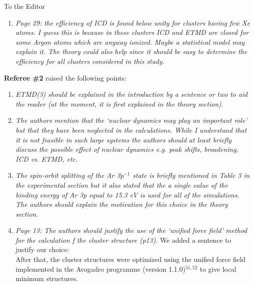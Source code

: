 \documentclass[DIN,pagenumber=false,parskip=half,fromalign=left,fromphone=true,fromemail=true,fromurl=false,fromlogo=false,fromrule=false]{scrlttr2}
\begin{document}
\begin{letter}{To the Editor}
\begin{enumerate}
  \item \emph{Page 29:
        the efficiency of ICD is found below unity for clusters having few Xe atoms. I guess this is because in these clusters ICD and ETMD are closed for some Argon atoms which are anyway ionized. Maybe a statistical model may explain it. The theory could also help since it should be easy to determine the efficiency for all clusters considered in this study.}


\end{enumerate}

\textbf{Referee \#2} raised the following points:

\begin{enumerate}
 \item \emph{ETMD(3) should be explained in the introduction by a sentence or two to aid the reader (at the moment, it is first explained in the theory section).
}
 \item \emph{The authors mention that the ‘nuclear dynamics may play an important role’ but that they have been neglected in the calculations. While I understand that it is not feasible in such large systems the authors should at least briefly discuss the possible effect of nuclear dynamics e.g. peak shifts, broadening, ICD vs. ETMD, etc. }

 \item \emph{The spin-orbit splitting of the Ar 3p$^{-1}$ state is briefly mentioned in Table 3 in the experimental section but it also stated that the a single value of the binding energy of Ar 3p equal to 15.3 eV is used for all of the simulations. The authors should explain the motivation for this choice in the theory section.}

 \item \emph{Page 13:
       The authors should justify the use of the ‘unified force field’ method for the calculation f the cluster structure (p13).}
       We added a sentence to justify our choice:\\
       After that, the cluster structures were optimized using the unified
       force field implemented in the Avogadro programme
       (version 1.1.0)$^{51,52}$ to give local minimum structures.
       {\color{blue}{ The method
       was chosen due to its low computational cost, the possibility to find
       the next local minimum structure based on the chosen starting point
       and the necessary effort to produce reliable results with density
       functional theory (DFT) for v. d. Waals interactions since we in
       this work discuss structural trends and not absolute structures.}}


\end{enumerate}
\end{letter}
\end{document}
